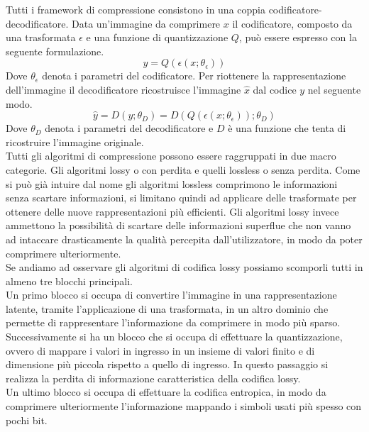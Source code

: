 Tutti i framework di compressione consistono in una coppia codificatore-decodificatore. Data un’immagine da comprimere $x$ il codificatore, composto da una trasformata $\epsilon$ e una funzione di quantizzazione $Q$, può essere espresso con la seguente formulazione.\\
\begin{equation}\label{eq:eqCondificatore}
    y = Q(\epsilon (x;\theta_{\epsilon}))
\end{equation}
Dove $\theta_{\epsilon}$ denota i parametri del codificatore.
Per riottenere la rappresentazione dell’immagine il decodificatore ricostruisce l’immagine $\hat{x}$ dal codice $y$ nel seguente modo.\\
\begin{equation}\label{eq:eqDecodificatore}
    \hat{y} = D(y;\theta_{D}) = D(Q(\epsilon (x;\theta_{\epsilon}));\theta_{D})
\end{equation}
Dove $\theta_{D}$ denota i parametri del decodificatore e $D$ è una funzione che tenta di ricostruire l'immagine originale.\cite{hu2021learning}\\
Tutti gli algoritmi di compressione possono essere raggruppati in due macro categorie. Gli algoritmi lossy o con perdita e quelli lossless o senza perdita. Come si può già intuire dal nome gli algoritmi lossless comprimono le informazioni senza scartare informazioni, si limitano quindi ad applicare delle trasformate per ottenere delle nuove rappresentazioni più efficienti. Gli algoritmi lossy invece ammettono la possibilità di scartare delle informazioni superflue che non vanno ad intaccare drasticamente la qualità percepita dall'utilizzatore, in modo da poter comprimere ulteriormente.\\
Se andiamo ad osservare gli algoritmi di codifica lossy possiamo scomporli tutti in almeno tre blocchi principali.\cite{sadeeq2021image} \\
Un primo blocco si occupa di convertire l’immagine in una rappresentazione latente, tramite l’applicazione di una trasformata, in un altro dominio che permette di rappresentare l’informazione da comprimere in modo più sparso.\\
Successivamente si ha un blocco che si occupa di effettuare la quantizzazione, ovvero di mappare i valori in ingresso in un insieme di valori finito e di dimensione più piccola rispetto a quello di ingresso. In questo passaggio si realizza la perdita di informazione caratteristica della codifica lossy.\\
Un ultimo blocco si occupa di effettuare la codifica entropica, in modo da comprimere ulteriormente l’informazione mappando i simboli usati più spesso con pochi bit.\\
